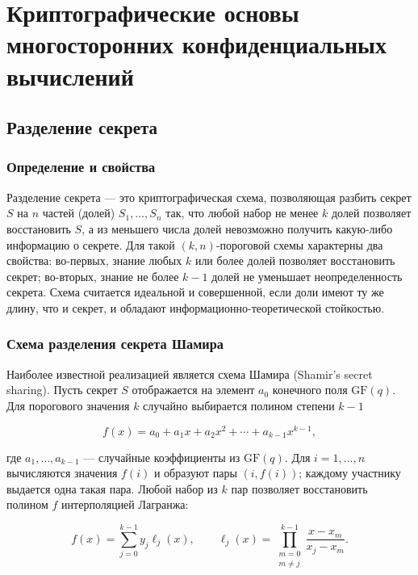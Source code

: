 \section{Криптографические основы многосторонних конфиденциальных вычислений}
\label{sec:cryptographic-foundations}

\subsection{Разделение секрета}
\label{subsec:secret-sharing}

\subsubsection{Определение и свойства}

Разделение секрета --- это криптографическая схема, позволяющая разбить секрет \(S\) на \(n\) частей (долей) \(S_1,\ldots,S_n\) так, что любой набор не менее \(k\) долей позволяет восстановить \(S\), а из меньшего числа долей невозможно получить какую-либо информацию о секрете. Для такой \((k,n)\)-пороговой схемы характерны два свойства: во-первых, знание любых \(k\) или более долей позволяет восстановить секрет; во-вторых, знание не более \(k-1\) долей не уменьшает неопределенность секрета. Схема считается идеальной и совершенной, если доли имеют ту же длину, что и секрет, и обладают информационно-теоретической стойкостью.

\subsubsection{Схема разделения секрета Шамира}

Наиболее известной реализацией является схема Шамира (Shamir’s secret sharing).  Пусть секрет \(S\) отображается на элемент \(a_0\) конечного поля \(\mathrm{GF}(q)\).  Для порогового значения \(k\) случайно выбирается полином степени \(k-1\)

\begin{equation}
f(x) = a_0 + a_1x + a_2x^2 + \cdots + a_{k-1}x^{k-1},
\end{equation}

где \(a_1,\ldots,a_{k-1}\) --- случайные коэффициенты из \(\mathrm{GF}(q)\).  Для \(i=1,\ldots,n\) вычисляются значения \(f(i)\) и образуют пары \((i, f(i))\); каждому участнику выдается одна такая пара.  Любой набор из \(k\) пар позволяет восстановить полином \(f\) интерполяцией Лагранжа:

\begin{equation}
f(x) = \sum_{j=0}^{k-1} y_j \ell_j(x), \qquad
\ell_j(x) = \prod_{\substack{m=0\\m \neq j}}^{k-1} \frac{x-x_m}{x_j-x_m}.
\label{eq:lagrange-interpolation}
\end{equation}

